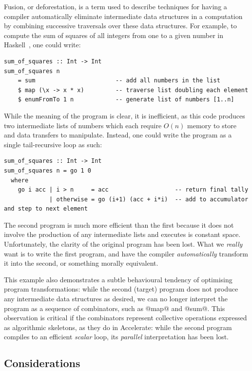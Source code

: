 Fusion, or deforestation, is a term used to describe techniques for having a
compiler automatically eliminate intermediate data structures in a computation
by combining successive traversals over these data structures. For example, to
compute the sum of squares of all integers from one to a given number in
Haskell~\cite{Haskell:1998}, one could write:
%
\begin{lstlisting}[style=haskell]
sum_of_squares :: Int -> Int
sum_of_squares n
    = sum                       -- add all numbers in the list
    $ map (\x -> x * x)         -- traverse list doubling each element
    $ enumFromTo 1 n            -- generate list of numbers [1..n]
\end{lstlisting}
%
While the meaning of the program is clear, it is inefficient, as this code
produces two intermediate lists of numbers which each require $O(n)$ memory to
store and data transfers to manipulate. Instead, one could write the program
as a single tail-recursive loop as such:
%
\begin{lstlisting}[style=haskell]
sum_of_squares :: Int -> Int
sum_of_squares n = go 1 0
  where
    go i acc | i > n     = acc                   -- return final tally
             | otherwise = go (i+1) (acc + i*i)  -- add to accumulator and step to next element
\end{lstlisting}
%
The second program is much more efficient than the first because it does not
involve the production of any intermediate lists and executes is constant space.
Unfortunately, the clarity of the original program has been lost. What we
\emph{really} want is to write the first program, and have the compiler
\emph{automatically} transform it into the second, or something morally
equivalent.

This example also demonstrates a subtle behavioural tendency of optimising
program transformations: while the second (target) program does not produce any
intermediate data structures as desired, we can no longer interpret the program
as a sequence of combinators, such as @map@ and @sum@. This observation is
critical if the combinators represent collective operations expressed as
algorithmic skeletons, as they do in Accelerate: while the second program
compiles to an efficient \emph{scalar} loop, its \emph{parallel} interpretation
has been lost.


\subsection{Considerations}

